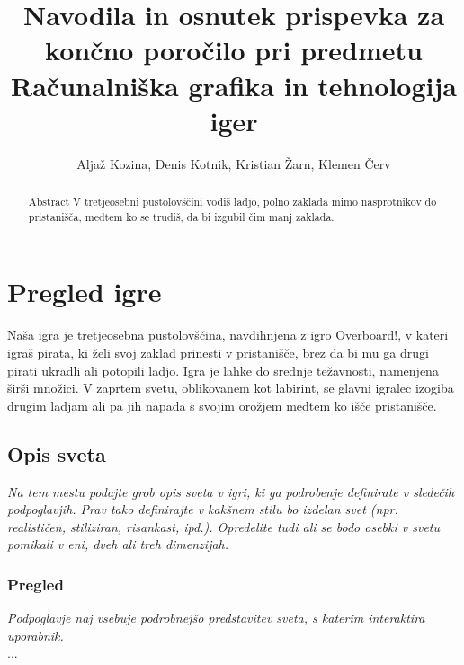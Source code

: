 \documentclass[a4paper]{article}
\begin{document}
\title{Navodila in osnutek prispevka za končno poročilo pri predmetu Računalniška grafika in tehnologija iger}

\author{Aljaž Kozina, Denis Kotnik, Kristian Žarn, Klemen Červ}



\maketitle


\begin{abstract}{Abstract}
V tretjeosebni pustolovščini vodiš ladjo, polno zaklada mimo nasprotnikov do pristanišča, medtem ko se trudiš, da bi izgubil čim manj zaklada.
\end{abstract}



\section{Pregled igre}
Naša igra je tretjeosebna pustolovščina, navdihnjena z igro Overboard!\cite{wiki:Overboard!}, v kateri igraš pirata, ki želi svoj zaklad prinesti v pristanišče, brez da bi mu ga drugi pirati ukradli ali potopili ladjo. Igra je lahke do srednje težavnosti, namenjena širši množici. V zaprtem svetu, oblikovanem kot labirint, se glavni igralec izogiba drugim ladjam ali pa jih napada s svojim orožjem medtem ko išče pristanišče.

\subsection{Opis sveta}
\textit{Na tem mestu podajte grob opis sveta v igri, ki ga podrobenje definirate v sledečih podpoglavjih. Prav tako definirajte v kakšnem stilu bo izdelan svet (npr. realističen, stiliziran, risankast, ipd.). Opredelite tudi ali se bodo osebki v svetu pomikali v eni, dveh ali treh dimenzijah.\\
}
\subsubsection{Pregled}
\textit{Podpoglavje naj vsebuje podrobnejšo predstavitev sveta, s katerim interaktira uporabnik. \\
}
...
\end{document}
